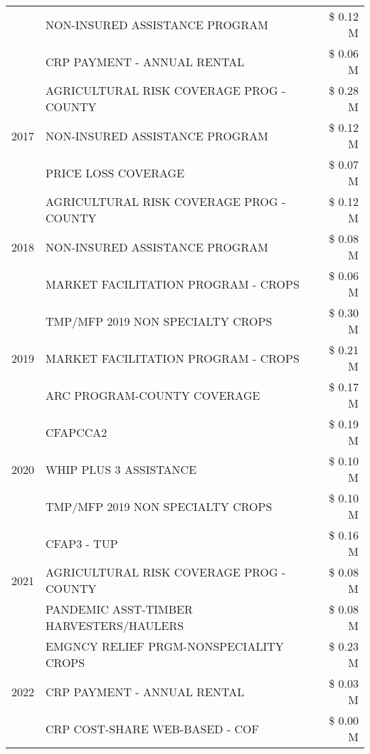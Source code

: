 \begin{tabular}{llr}
 & NON-INSURED ASSISTANCE PROGRAM & \$ 0.12 M \\
 & CRP PAYMENT - ANNUAL RENTAL & \$ 0.06 M \\
\cline{1-3}
\multirow[t]{3}{*}{2017} & AGRICULTURAL RISK COVERAGE PROG - COUNTY & \$ 0.28 M \\
 & NON-INSURED ASSISTANCE PROGRAM & \$ 0.12 M \\
 & PRICE LOSS COVERAGE & \$ 0.07 M \\
\cline{1-3}
\multirow[t]{3}{*}{2018} & AGRICULTURAL RISK COVERAGE PROG - COUNTY & \$ 0.12 M \\
 & NON-INSURED ASSISTANCE PROGRAM & \$ 0.08 M \\
 & MARKET FACILITATION PROGRAM - CROPS & \$ 0.06 M \\
\cline{1-3}
\multirow[t]{3}{*}{2019} & TMP/MFP 2019 NON SPECIALTY CROPS & \$ 0.30 M \\
 & MARKET FACILITATION PROGRAM - CROPS & \$ 0.21 M \\
 & ARC PROGRAM-COUNTY COVERAGE & \$ 0.17 M \\
\cline{1-3}
\multirow[t]{3}{*}{2020} & CFAPCCA2 & \$ 0.19 M \\
 & WHIP PLUS 3 ASSISTANCE & \$ 0.10 M \\
 & TMP/MFP 2019 NON SPECIALTY CROPS & \$ 0.10 M \\
\cline{1-3}
\multirow[t]{3}{*}{2021} & CFAP3 - TUP & \$ 0.16 M \\
 & AGRICULTURAL RISK COVERAGE PROG - COUNTY & \$ 0.08 M \\
 & PANDEMIC ASST-TIMBER HARVESTERS/HAULERS & \$ 0.08 M \\
\cline{1-3}
\multirow[t]{3}{*}{2022} & EMGNCY RELIEF PRGM-NONSPECIALITY CROPS & \$ 0.23 M \\
 & CRP PAYMENT - ANNUAL RENTAL & \$ 0.03 M \\
 & CRP COST-SHARE WEB-BASED - COF & \$ 0.00 M \\
\cline{1-3}
\bottomrule
\end{tabular}
